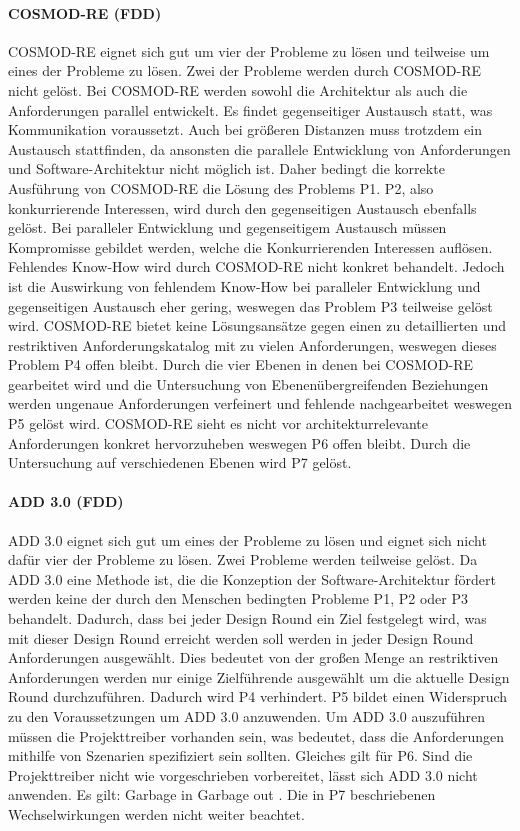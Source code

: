 \paragraph{COSMOD-RE (FDD)}
COSMOD-RE eignet sich gut um vier der Probleme zu lösen und teilweise um eines der Probleme zu lösen. Zwei der Probleme werden durch COSMOD-RE nicht gelöst. Bei COSMOD-RE werden sowohl die Architektur als auch die Anforderungen parallel entwickelt. Es findet gegenseitiger Austausch statt, was Kommunikation voraussetzt. Auch bei größeren Distanzen muss trotzdem ein Austausch stattfinden, da ansonsten die parallele Entwicklung von Anforderungen und Software-Architektur nicht möglich ist. Daher bedingt die korrekte Ausführung von COSMOD-RE die Lösung des Problems P1. P2, also konkurrierende Interessen, wird durch den gegenseitigen Austausch ebenfalls gelöst. Bei paralleler Entwicklung und gegenseitigem Austausch müssen Kompromisse gebildet werden, welche die Konkurrierenden Interessen auflösen. Fehlendes Know-How wird durch COSMOD-RE nicht konkret behandelt. Jedoch ist die Auswirkung von fehlendem Know-How bei paralleler Entwicklung und gegenseitigen Austausch eher gering, weswegen das Problem P3 teilweise gelöst wird. COSMOD-RE bietet keine Lösungsansätze gegen einen zu detaillierten und restriktiven Anforderungskatalog mit zu vielen Anforderungen, weswegen dieses Problem P4 offen bleibt. Durch die vier Ebenen in denen bei COSMOD-RE gearbeitet wird und die Untersuchung von Ebenenübergreifenden Beziehungen werden ungenaue Anforderungen verfeinert und fehlende nachgearbeitet weswegen P5 gelöst wird. COSMOD-RE sieht es nicht vor architekturrelevante Anforderungen konkret hervorzuheben weswegen P6 offen bleibt. Durch die Untersuchung auf verschiedenen Ebenen wird P7 gelöst.\\

\paragraph{ADD 3.0 (FDD)}
ADD 3.0 eignet sich gut um eines der Probleme zu lösen und eignet sich nicht dafür vier der Probleme zu lösen. Zwei Probleme werden teilweise gelöst. Da ADD 3.0 eine Methode ist, die die Konzeption der Software-Architektur fördert werden keine der durch den Menschen bedingten Probleme P1, P2 oder P3 behandelt. Dadurch, dass bei jeder Design Round ein Ziel festgelegt wird, was mit dieser Design Round erreicht werden soll werden in jeder Design Round Anforderungen ausgewählt. Dies bedeutet von der großen Menge an restriktiven Anforderungen werden nur einige Zielführende ausgewählt um die aktuelle Design Round durchzuführen. Dadurch wird P4 verhindert. P5 bildet einen Widerspruch zu den Voraussetzungen um ADD 3.0 anzuwenden. Um ADD 3.0 auszuführen müssen die Projekttreiber vorhanden sein, was bedeutet, dass die Anforderungen mithilfe von Szenarien spezifiziert sein sollten. Gleiches gilt für P6. Sind die Projekttreiber nicht wie vorgeschrieben vorbereitet, lässt sich ADD 3.0 nicht anwenden. Es gilt: Garbage in Garbage out \cite{Cer01}. Die in P7 beschriebenen Wechselwirkungen werden nicht weiter beachtet.\\
